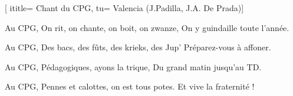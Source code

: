 [
ititle= {Chant du CPG},
tu= {Valencia (J.Padilla, J.A. De Prada)}]


\beginverse
Au CPG,
On rit, on chante, on boit, on zwanze,
On y guindaille toute l'année.
\endverse

\beginverse
Au CPG,
Des bacs, des fûts, des krieks, des Jup'
Préparez-vous à affoner.
\endverse

\beginverse
Au CPG,
Pédagogiques, ayons la trique,
Du grand matin jusqu'au TD.
\endverse

\beginverse
Au CPG,
Pennes et calottes, on est tous potes.
Et vive la fraternité !
\endverse

\endsong